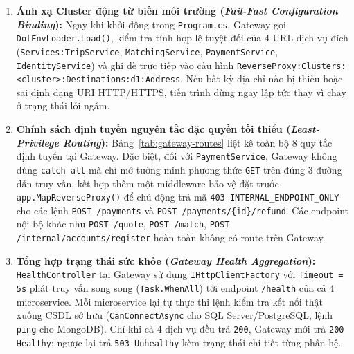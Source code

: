 \documentclass[12pt,a4paper]{article}
\begin{document}
\begin{enumerate}[leftmargin=1.5em]
    \item \textbf{Ánh xạ Cluster động từ biến môi trường (\textit{Fail-Fast Configuration Binding}):} Ngay khi khởi động trong \texttt{Program.cs}, Gateway gọi \texttt{DotEnvLoader.Load()}, kiểm tra tính hợp lệ tuyệt đối của 4 URL dịch vụ đích (\texttt{Services:TripService}, \texttt{MatchingService}, \texttt{PaymentService}, \texttt{IdentityService}) và ghi đè trực tiếp vào cấu hình \texttt{ReverseProxy:Clusters:<cluster>:Destinations:d1:Address}. Nếu bất kỳ địa chỉ nào bị thiếu hoặc sai định dạng URI HTTP/HTTPS, tiến trình dừng ngay lập tức thay vì chạy ở trạng thái lỗi ngầm.
    \item \textbf{Chính sách định tuyến nguyên tắc đặc quyền tối thiểu (\textit{Least-Privilege Routing}):} Bảng~\ref{tab:gateway-routes} liệt kê toàn bộ 8 quy tắc định tuyến tại Gateway. Đặc biệt, đối với \texttt{PaymentService}, Gateway không dùng \texttt{catch-all} mà chỉ mở tường minh phương thức \texttt{GET} trên đúng 3 đường dẫn truy vấn, kết hợp thêm một middleware bảo vệ đặt trước \texttt{app.MapReverseProxy()} để chủ động trả mã \texttt{403 INTERNAL\_ENDPOINT\_ONLY} cho các lệnh \texttt{POST /payments} và \texttt{POST /payments/\{id\}/refund}. Các endpoint nội bộ khác như \texttt{POST /quote}, \texttt{POST /match}, \texttt{POST /internal/accounts/register} hoàn toàn không có route trên Gateway.
    \item \textbf{Tổng hợp trạng thái sức khỏe (\textit{Gateway Health Aggregation}):} \texttt{HealthController} tại Gateway sử dụng \texttt{IHttpClientFactory} với \texttt{Timeout = 5s} phát truy vấn song song (\texttt{Task.WhenAll}) tới endpoint \texttt{/health} của cả 4 microservice. Mỗi microservice lại tự thực thi lệnh kiểm tra kết nối thật xuống CSDL sở hữu (\texttt{CanConnectAsync} cho SQL Server/PostgreSQL, lệnh \texttt{ping} cho MongoDB). Chỉ khi cả 4 dịch vụ đều trả \texttt{200}, Gateway mới trả \texttt{200 Healthy}; ngược lại trả \texttt{503 Unhealthy} kèm trạng thái chi tiết từng phân hệ.
\end{enumerate}
\end{document}
